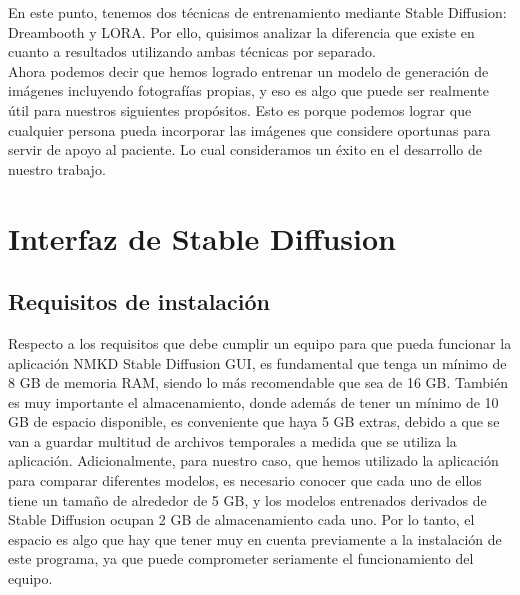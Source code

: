 En este punto, tenemos dos técnicas de entrenamiento mediante Stable Diffusion: Dreambooth y LORA. Por ello, quisimos analizar la diferencia que existe en cuanto a resultados utilizando ambas técnicas por separado. \\


Ahora podemos decir que hemos logrado entrenar un modelo de generación de imágenes incluyendo fotografías propias, y eso es algo que puede ser realmente útil para nuestros siguientes propósitos. Esto es porque podemos lograr que cualquier persona pueda incorporar las imágenes que considere oportunas para servir de apoyo al paciente. Lo cual consideramos un éxito en el desarrollo de nuestro trabajo. 


\section{Interfaz de Stable Diffusion}

\subsection{Requisitos de instalación}

Respecto a los requisitos que debe cumplir un equipo para que pueda funcionar la aplicación NMKD Stable Diffusion GUI, es fundamental que tenga un mínimo de 8 GB de memoria RAM, siendo lo más recomendable que sea de 16 GB. También es muy importante el almacenamiento, donde además de tener un mínimo de 10 GB de espacio disponible, es conveniente que haya 5 GB extras, debido a que se van a guardar multitud de archivos temporales a medida que se utiliza la aplicación. Adicionalmente, para nuestro caso, que hemos utilizado la aplicación para comparar diferentes modelos, es necesario conocer que cada uno de ellos tiene un tamaño de alrededor de 5 GB, y los modelos entrenados derivados de Stable Diffusion ocupan 2 GB de almacenamiento cada uno. Por lo tanto, el espacio es algo que hay que tener muy en cuenta previamente a la instalación de este programa, ya que puede comprometer seriamente el funcionamiento del equipo. \\

